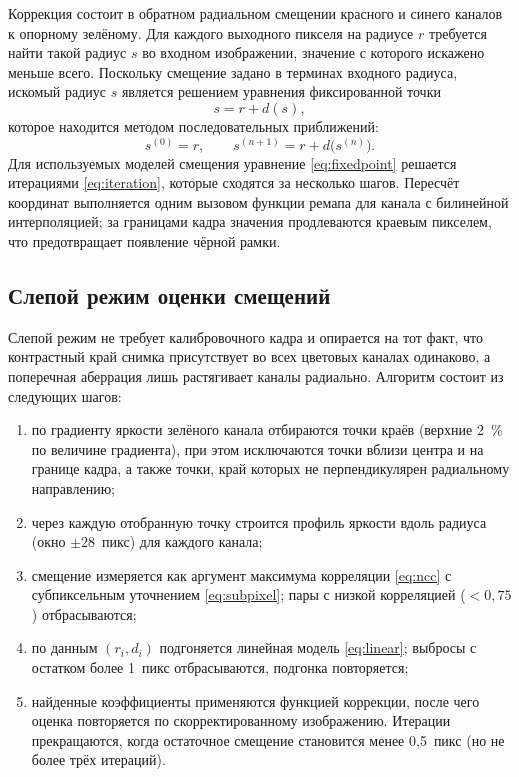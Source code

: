 \documentclass[a4paper,14pt,oneside]{extreport}
\begin{document}
Коррекция состоит в обратном радиальном смещении красного и синего
каналов к опорному зелёному. Для каждого выходного пикселя на радиусе
$r$ требуется найти такой радиус $s$ во входном изображении, значение с
которого искажено меньше всего. Поскольку смещение задано в терминах
входного радиуса, искомый радиус $s$ является решением уравнения
фиксированной точки
\begin{equation}
s = r + d(s),
\label{eq:fixedpoint}
\end{equation}
которое находится методом последовательных приближений:
\begin{equation}
s^{(0)} = r, \qquad s^{(n+1)} = r + d\bigl(s^{(n)}\bigr).
\label{eq:iteration}
\end{equation}
Для используемых моделей смещения уравнение \eqref{eq:fixedpoint}
решается итерациями \eqref{eq:iteration}, которые сходятся
за несколько шагов. Пересчёт координат выполняется одним вызовом функции
ремапа для канала с билинейной интерполяцией; за границами кадра значения
продлеваются краевым пикселем, что предотвращает появление чёрной рамки.

\subsection{Слепой режим оценки смещений}

Слепой режим не требует калибровочного кадра и опирается на тот факт, что
контрастный край снимка присутствует во всех цветовых каналах
одинаково, а поперечная аберрация лишь растягивает каналы радиально.
Алгоритм состоит из следующих шагов:
\begin{enumerate}
\item по градиенту яркости зелёного канала отбираются точки краёв
(верхние 2~\% по величине градиента), при этом исключаются точки вблизи
центра и на границе кадра, а также точки, край которых не перпендикулярен
радиальному направлению;
\item через каждую отобранную точку строится профиль яркости вдоль
радиуса (окно $\pm28$~пикс) для каждого канала;
\item смещение измеряется как аргумент максимума корреляции \eqref{eq:ncc}
с субпиксельным уточнением \eqref{eq:subpixel}; пары с низкой корреляцией
($<0{,}75$) отбрасываются;
\item по данным $(r_i, d_i)$ подгоняется линейная модель \eqref{eq:linear};
выбросы с остатком более 1~пикс отбрасываются, подгонка повторяется;
\item найденные коэффициенты применяются функцией коррекции, после чего
оценка повторяется по скорректированному изображению. Итерации
прекращаются, когда остаточное смещение становится менее 0,5~пикс
(но не более трёх итераций).
\end{enumerate}
\end{document}
